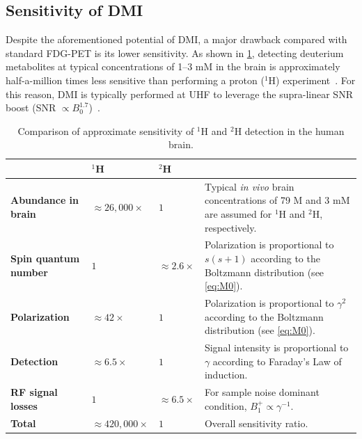 \subsection{Sensitivity of DMI}
\label{subsec:DMIsens}
Despite the aforementioned potential of \gls{DMI}, a major drawback compared with standard FDG-\gls{PET} is its lower sensitivity. As shown in \cref{tab:proton_deuterium_comparison}, detecting deuterium metabolites at typical concentrations of 1--3 mM in the brain is approximately half-a-million times less sensitive than performing a proton ($^1$H) experiment~\cite{degraafMagneticFieldDependence2020,laddProsConsUltrahighfield2018}. For this reason, \gls{DMI} is typically performed at \gls{UHF} to leverage the supra-linear SNR boost (SNR $\propto B_0^{1.7}$)~\cite{pohmannSignaltonoiseRatioMR2016,degraafMagneticFieldDependence2020}.
\begin{table}[h!]
	\centering
	\caption{Comparison of approximate sensitivity of $^{1}$H and $^{2}$H detection in the human brain.}
	\begin{tabularx}{\textwidth}{
			>{\bfseries\centering}m{}
			>{\centering\arraybackslash}m{}
			>{\centering\arraybackslash}m{}
			>{\raggedright\arraybackslash}m{}
		}
		\toprule
		& \textbf{$^1$H} & \textbf{$^2$H} & \makecell[c]{\textbf{Remarks}}\\
		\midrule
		Abundance in brain & $\approx 26{,}000\times$ & $1$ & Typical \textit{in vivo} brain concentrations of 79 M and 3 mM are assumed for $^{1}$H and $^{2}$H, respectively. \\
		
		Spin quantum number & $1$ & $\approx 2.6\times$ & Polarization is proportional to $s(s+1)$ according to the Boltzmann distribution (see \cref{eq:M0}). \\
		
		Polarization & $\approx 42\times$ & $1$ & Polarization is proportional to $\gamma^2$ according to the Boltzmann distribution (see \cref{eq:M0}). \\
		
		Detection & $\approx 6.5\times$ & $1$ & Signal intensity is proportional to $\gamma$ according to Faraday's Law of induction. \\
		\gls{RF} signal losses & $1$ & $\approx 6.5\times$ & For sample noise dominant condition, $B_1^+ \propto \gamma^{-1}$\cite{degraafMagneticFieldDependence2020}. \\
		\midrule
		\textbf{Total} & $\approx 420{,}000\times$ & $1$ & Overall sensitivity ratio. \\
		\bottomrule
	\end{tabularx}
	\label{tab:proton_deuterium_comparison}
\end{table}


